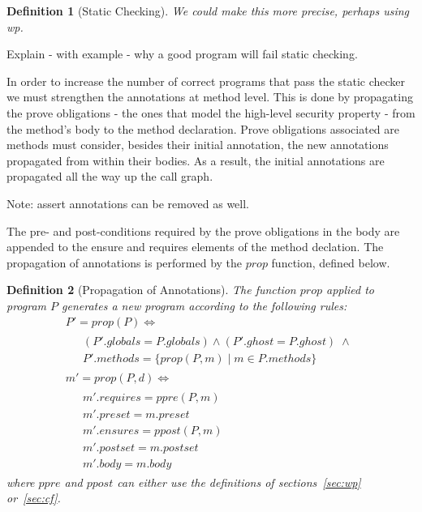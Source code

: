 \documentclass[10pt,notitlepage,twoside]{article}
\newcommand{\ppre}{\mathit{ppre}}
\newcommand{\ppost}{\mathit{ppost}}
\newtheorem{definition}{Definition}
\begin{document}
\begin{definition}[Static Checking]
We could make this more precise, perhaps using wp.
\end{definition}


Explain - with example - why a good program will fail static checking.

In order to increase the number of correct programs that pass the static checker we must strengthen the annotations at method level. This is done by propagating the prove obligations - the ones that model the high-level security property - from the method's body to the method declaration.
Prove obligations associated are methods must consider, besides their initial annotation, the new annotations propagated from within their bodies.
As a result, the initial annotations are propagated all the way up the call graph.

Note: assert annotations can be removed as well.

The pre- and post-conditions required by the prove obligations in the body are appended to the ensure and requires elements of the method declation.
The propagation of annotations is performed  by the $\mathit{prop}$ function, defined below.



\begin{definition}[Propagation of Annotations]
The function $\mathit{prop}$ applied to program $P$ generates a new program  according to the following rules:
\begin{displaymath}
\begin{array}{l}
P' = \mathit{prop}(P) \Leftrightarrow \\
\;\;\;\;
\begin{array}{l}
(P'.\mathit{globals} = P.\mathit{globals}) \wedge (P'.\mathit{ghost} = P.\mathit{ghost}) \;\wedge \\
P'.\mathit{methods} = \{ \mathit{prop}(P,m) \mid m \in P.\mathit{methods}  \}
\end{array} \\
m' = \mathit{prop}(P,d)  \Leftrightarrow \\
\;\;\;\;
\begin{array}{l}
m'.\mathit{requires} = \ppre(P,m)  \\
m'.\mathit{preset} = m.\mathit{preset} \\
m'.\mathit{ensures} = \ppost(P,m)  \\
m'.\mathit{postset} = m.\mathit{postset} \\
m'.\mathit{body} = m.\mathit{body}
\end{array}
\end{array}
\end{displaymath}
where $\ppre$ and $\ppost$ can either use the definitions of sections~\ref{sec:wp} or~\ref{sec:cf}. 
\end{definition}
\end{document}
